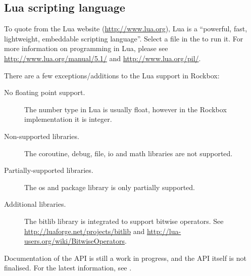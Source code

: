 \subsection{Lua scripting language}

To quote from the Lua website (\url{http://www.lua.org}), Lua is a ``powerful,
fast, lightweight, embeddable scripting language''. Select a  file
in the  to run it. For more information on programming
in Lua, please see \url{http://www.lua.org/manual/5.1/} and
\url{http://www.lua.org/pil/}.

There are a few exceptions/additions to the Lua support in Rockbox:
\begin{description}
    \item[No floating point support.] The number type in Lua is usually float,
    however in the Rockbox implementation it is integer.
    \item[Non-supported libraries.] The coroutine, debug, file, io and math
    libraries are not supported.
    \item[Partially-supported libraries.]  The os and package library is only
    partially supported.
    \item[Additional libraries.] The bitlib library is integrated to support
    bitwise operators.  See \url{http://luaforge.net/projects/bitlib} and
    \url{http://lua-users.org/wiki/BitwiseOperators}.
\end{description}

Documentation of the API is still a work in progress, and the API itself is
not finalised. For the latest information, see .\\

